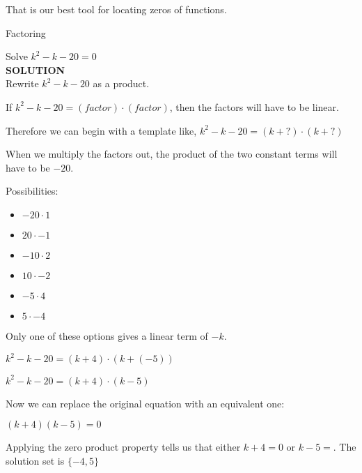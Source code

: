 \documentclass{ximera}
\begin{document}
That is our best tool for locating zeros of functions. \\



\begin{example} Factoring

Solve $k^2 - k - 20 = 0$ \\

\textbf{\textcolor{purple!50!blue!90!black}{SOLUTION}} \\



Rewrite $k^2 - k - 20$ as a product.

If $k^2 - k - 20 = (factor) \cdot (factor)$, then the factors will have to be linear.

Therefore we can begin with a template like, $k^2 - k - 20 = (k + ?) \cdot (k + ?)$

When we multiply the factors out, the product of the two constant terms will have to be $-20$.

Possibilities:
\begin{itemize}
\item $-20 \cdot 1$
\item $20 \cdot -1$
\item $-10 \cdot 2$
\item $10 \cdot -2$
\item $-5 \cdot 4$
\item $5 \cdot -4$
\end{itemize}



Only one of these options gives a linear term of $-k$.


$k^2 - k - 20 = (k + 4) \cdot (k + (-5))$

$k^2 - k - 20 = (k + 4) \cdot (k - 5)$



Now we can replace the original equation with an equivalent one:


$(k + 4) (k - 5) = 0$



Applying the zero product property tells us that either $k + 4 = 0$ or $k - 5 = $.  The solution set is $\{ -4, 5 \}$





\end{example}
\end{document}
